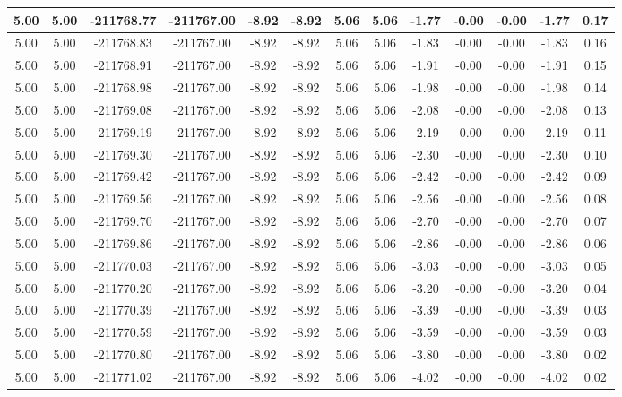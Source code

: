 \begin{table}[htbp]
\begin{adjustbox}{angle=90}
\begin{tabular}{|c|c|c|c|c|c|c|c|c|c|c|c|c|}
 5.00 & 5.00 & -211768.77 & -211767.00 & -8.92 & -8.92 & 5.06 & 5.06 & -1.77 & -0.00 & -0.00 & -1.77 & 0.17\\ \hline
 5.00 & 5.00 & -211768.83 & -211767.00 & -8.92 & -8.92 & 5.06 & 5.06 & -1.83 & -0.00 & -0.00 & -1.83 & 0.16\\ \hline
 5.00 & 5.00 & -211768.91 & -211767.00 & -8.92 & -8.92 & 5.06 & 5.06 & -1.91 & -0.00 & -0.00 & -1.91 & 0.15\\ \hline
 5.00 & 5.00 & -211768.98 & -211767.00 & -8.92 & -8.92 & 5.06 & 5.06 & -1.98 & -0.00 & -0.00 & -1.98 & 0.14\\ \hline
 5.00 & 5.00 & -211769.08 & -211767.00 & -8.92 & -8.92 & 5.06 & 5.06 & -2.08 & -0.00 & -0.00 & -2.08 & 0.13\\ \hline
 5.00 & 5.00 & -211769.19 & -211767.00 & -8.92 & -8.92 & 5.06 & 5.06 & -2.19 & -0.00 & -0.00 & -2.19 & 0.11\\ \hline
 5.00 & 5.00 & -211769.30 & -211767.00 & -8.92 & -8.92 & 5.06 & 5.06 & -2.30 & -0.00 & -0.00 & -2.30 & 0.10\\ \hline
 5.00 & 5.00 & -211769.42 & -211767.00 & -8.92 & -8.92 & 5.06 & 5.06 & -2.42 & -0.00 & -0.00 & -2.42 & 0.09\\ \hline
 5.00 & 5.00 & -211769.56 & -211767.00 & -8.92 & -8.92 & 5.06 & 5.06 & -2.56 & -0.00 & -0.00 & -2.56 & 0.08\\ \hline
 5.00 & 5.00 & -211769.70 & -211767.00 & -8.92 & -8.92 & 5.06 & 5.06 & -2.70 & -0.00 & -0.00 & -2.70 & 0.07\\ \hline
 5.00 & 5.00 & -211769.86 & -211767.00 & -8.92 & -8.92 & 5.06 & 5.06 & -2.86 & -0.00 & -0.00 & -2.86 & 0.06\\ \hline
 5.00 & 5.00 & -211770.03 & -211767.00 & -8.92 & -8.92 & 5.06 & 5.06 & -3.03 & -0.00 & -0.00 & -3.03 & 0.05\\ \hline
 5.00 & 5.00 & -211770.20 & -211767.00 & -8.92 & -8.92 & 5.06 & 5.06 & -3.20 & -0.00 & -0.00 & -3.20 & 0.04\\ \hline
 5.00 & 5.00 & -211770.39 & -211767.00 & -8.92 & -8.92 & 5.06 & 5.06 & -3.39 & -0.00 & -0.00 & -3.39 & 0.03\\ \hline
 5.00 & 5.00 & -211770.59 & -211767.00 & -8.92 & -8.92 & 5.06 & 5.06 & -3.59 & -0.00 & -0.00 & -3.59 & 0.03\\ \hline
 5.00 & 5.00 & -211770.80 & -211767.00 & -8.92 & -8.92 & 5.06 & 5.06 & -3.80 & -0.00 & -0.00 & -3.80 & 0.02\\ \hline
 5.00 & 5.00 & -211771.02 & -211767.00 & -8.92 & -8.92 & 5.06 & 5.06 & -4.02 & -0.00 & -0.00 & -4.02 & 0.02\\ \hline

\end{tabular}
\end{adjustbox}
\end{table}
